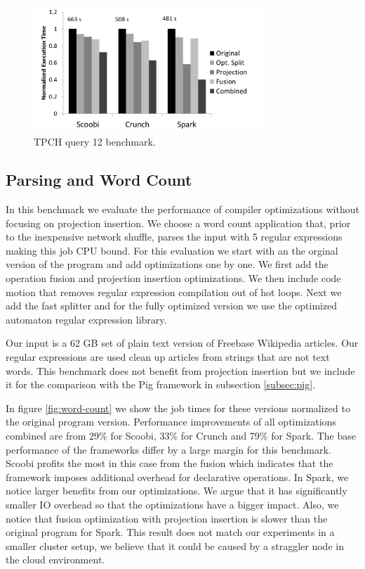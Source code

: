 \begin{figure}[!hbt]
    \includegraphics[width=8.6cm]{figures/tpch}

   \caption{TPCH query 12 benchmark.}
  \label{fig:tpch}%
\end{figure}

\subsection{Parsing and Word Count}
\label{subsec:parsing-word-count}

In this benchmark we evaluate the performance of \tool compiler optimizations without focusing on projection insertion. We choose a word count application that, prior to the inexpensive network shuffle, parses the input with 5 regular expressions making this job CPU bound. For this evaluation we start with an the orginal version of the program and add optimizations one by one. We first add the operation fusion and projection insertion optimizations. We then include code motion that removes regular expression compilation out of hot loops. Next we add the fast splitter and for the fully optimized version we use the optimized automaton regular expression library.    

Our input is a 62 GB set of plain text version of Freebase Wikipedia articles. Our regular expressions are used clean up articles from strings that are not text words. This benchmark does not benefit from projection insertion but we include it for the comparison with the Pig framework in subsection \ref{subsec:pig}.

In figure \ref{fig:word-count} we show the job times for these versions normalized to the original program version. Performance improvements of all optimizations combined are from 29\% for Scoobi, 33\% for Crunch and 79\% for Spark. The base performance of the frameworks differ by a large margin for this benchmark. Scoobi profits the most in this case from the fusion which indicates that the framework imposes additional overhead for declarative operations. In Spark, we notice larger benefits from our optimizations. We argue that it has significantly smaller IO overhead so that the optimizations have a bigger impact. Also, we notice that fusion optimization with projection insertion is slower than the original program for Spark. This result does not match our experiments in a smaller cluster setup, we believe that it could be caused by a straggler node in the cloud environment.

